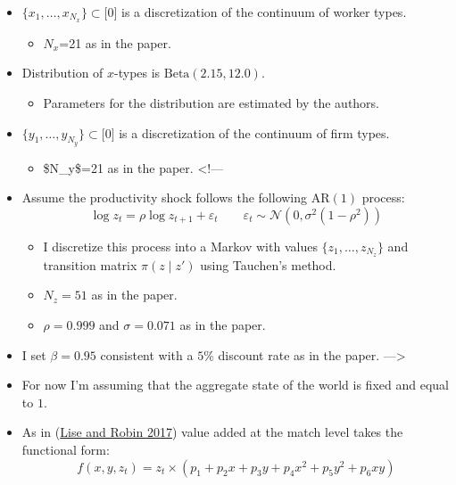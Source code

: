 \documentclass[
  letterpaper,
  DIV=11,
  numbers=noendperiod]{scrreprt}
\providecommand{\tightlist}{%
  \setlength{\itemsep}{0pt}\setlength{\parskip}{0pt}}\usepackage{longtable,booktabs,array}
\begin{document}
\begin{itemize}
\item
  \(\{x_1,\ldots,x_{N_x}\}\subset[\)0\(]\) is a discretization of the
  continuum of worker types.

  \begin{itemize}
  \tightlist
  \item
    \(N_x\)=21 as in the paper.
  \end{itemize}
\item
  Distribution of \(x\)-types is \(\text{Beta}(2.15, 12.0)\).

  \begin{itemize}
  \tightlist
  \item
    Parameters for the distribution are estimated by the authors.
  \end{itemize}
\item
  \(\{y_1,\ldots,y_{N_y}\}\subset[\)0\(]\) is a discretization of the
  continuum of firm types.

  \begin{itemize}
  \tightlist
  \item
    \$N\_y\$=21 as in the paper. \textless!---
  \end{itemize}
\item
  Assume the productivity shock follows the following \(\text{AR}(1)\)
  process:\[\log{z_{t}} = \rho \log{z_{t+1}}+\varepsilon_t \qquad \varepsilon_t \sim \mathcal{N}(0,\sigma^2(1-\rho^2))\]

  \begin{itemize}
  \tightlist
  \item
    I discretize this process into a Markov with values
    \(\{z_1,\ldots,z_{N_z}\}\) and transition matrix \(\pi(z\mid z')\)
    using Tauchen's method.
  \item
    \(N_z=51\) as in the paper.
  \item
    \(\rho=0.999\) and \(\sigma = 0.071\) as in the paper.
  \end{itemize}
\item
  I set \(\beta=0.95\) consistent with a \(5\%\) discount rate as in the
  paper. ---\textgreater{}
\item
  For now I'm assuming that the aggregate state of the world is fixed
  and equal to \(1\).
\item
  As in
  (\protect\hyperlink{ref-liseMacrodynamicsSortingWorkers2017}{Lise and
  Robin 2017}) value added at the match level takes the functional form:
  \[f(x,y,z_t) = z_t\times(p_1 + p_2 x + p_3y + p_4 x^2+ p_5 y^2 + p_6 xy)\]


\end{itemize}
\end{document}
